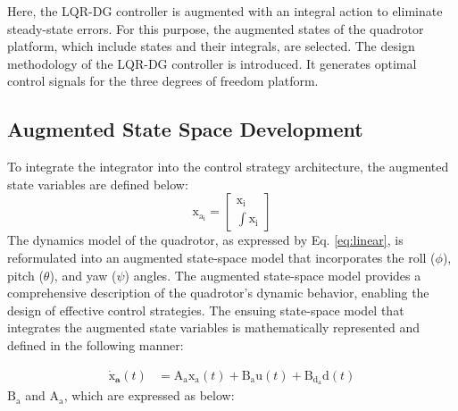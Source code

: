 \documentclass[3p,times]{elsarticle}
\begin{document}
\noindent Here, the LQR-DG controller is augmented with an integral action to eliminate steady-state errors. For this purpose, the augmented states of the quadrotor platform, which include states and their integrals, are selected. The design methodology of the LQR-DG controller is introduced. It generates optimal control signals for the three degrees of freedom platform.

\subsection{Augmented State Space Development}
\noindent To integrate the integrator into the control strategy architecture, the augmented state variables are defined below:
\begin{equation}\label{lqidg_x}
    \boldsymbol{\mathrm{x_{a_i}}} = \begin{bmatrix}
        \boldsymbol{\mathrm{x_i}} \\[1em]
        \displaystyle\int\boldsymbol{\mathrm{x_i}}
    \end{bmatrix}
\end{equation}
The dynamics model of the quadrotor, as expressed by Eq. \eqref{eq:linear}, is reformulated into an augmented state-space model that incorporates the roll ($\phi$), pitch ($\theta$), and yaw ($\psi$) angles. The augmented state-space model provides a comprehensive description of the quadrotor's dynamic behavior, enabling the design of effective control strategies. The ensuing state-space model that integrates the augmented state variables is mathematically represented and defined in the following manner:

\begin{equation}\label{systemlqidg}
	\begin{split}
		\boldsymbol{\dot{\mathrm{x}}_a}(t) &= \boldsymbol{\mathrm{A_ax_a}}(t) + \boldsymbol{\mathrm{B_{{a}}u}}(t) + \boldsymbol{\mathrm{B_{{d_a}}d}}(t)%
	\end{split}
\end{equation}
$\boldsymbol{\mathrm{B_a}}$ and $\boldsymbol{\mathrm{A_a}}$, which are expressed as below:
\end{document}
